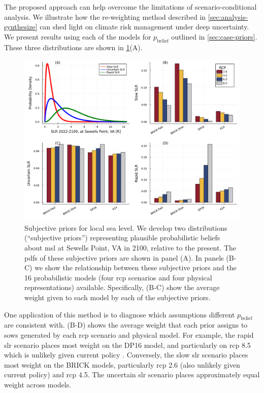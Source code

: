 \documentclass[11pt]{article}
\begin{document}
The proposed approach can help overcome the limitations of scenario-conditional analysis.
We illustrate how the re-weighting method described in \cref{sec:analysis-synthesize} can shed light on climate risk management under deep uncertainty.
We present results using each of the models for $p_\mathrm{belief}$ outlined in \cref{sec:case-priors}.
These three distributions are shown in \cref{fig:lsl-priors-weights}(A).

\begin{figure}
    \centering
    \includegraphics[width=\textwidth]{lsl-priors-weights}
    \caption{
        Subjective priors for local sea level.
        We develop two distributions (``subjective priors'') representing plausible probabilistic beliefs about \gls{msl} at Sewells Point, VA in 2100, relative to the present.
        The \glspl{pdf} of these subjective priors are shown in panel (A).
        In panels (B-C) we show the relationship between these subjective priors and the 16 probabilistic models (four \gls{rcp} scenarios and four physical representations) available.
        Specifically, (B-C) show the average weight given to each model by each of the subjective priors.
    }\label{fig:lsl-priors-weights}
\end{figure}

One application of this method is to diagnose which assumptions different $p_\mathrm{belief}$ are consistent with.
(B-D) shows the average weight that each prior assigns to \glspl{sow} generated by each \gls{rcp} scenario and physical model.
For example, the rapid \gls{slr} scenario places most weight on the DP16 model, and particularly on \gls{rcp} 8.5 which is unlikely given current policy \citep{hausfather_scenarios:2020,srikrishnan_probabilistic:2022}.
Conversely, the slow \gls{slr} scenario places most weight on the BRICK models, particularly \gls{rcp} 2.6 (also unlikely given current policy) and \gls{rcp} 4.5.
The uncertain \gls{slr} scenario places approximately equal weight across models.
\end{document}
